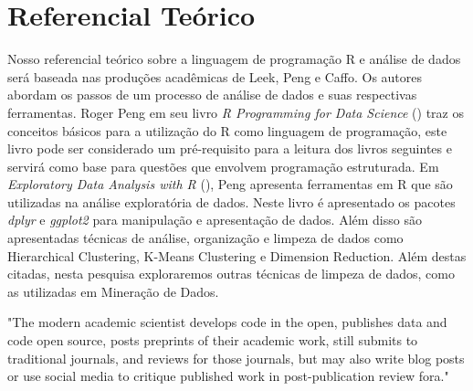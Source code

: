\chapter[Referencial Teórico]{Referencial Teórico}

Nosso referencial teórico sobre a linguagem de programação R e análise de dados 
será baseada nas produções acadêmicas de Leek, Peng e Caffo. Os autores abordam os passos de um processo de análise de dados e 
suas respectivas ferramentas. Roger Peng em seu livro \emph{R Programming for Data 
Science} (\citeyear{Peng2015a}) traz os conceitos básicos para a utilização do R como linguagem de 
programação, este livro pode ser considerado um pré-requisito para a leitura dos 
livros seguintes e servirá como base para questões que envolvem programação 
estruturada. Em \emph{Exploratory Data Analysis with R} (\citeyear{Peng2016}), Peng apresenta ferramentas 
em R que são utilizadas na análise exploratória de dados. Neste livro é 
apresentado os pacotes \emph{dplyr} \cite{Wickham2018} e \emph{ggplot2} \cite{Wickham2009} para manipulação e apresentação de 
dados. Além disso são apresentadas técnicas de análise, organização e limpeza de 
dados como Hierarchical Clustering, K-Means Clustering e Dimension Reduction. 
Além destas citadas, nesta pesquisa exploraremos outras técnicas de limpeza de 
dados, como as utilizadas em Mineração de Dados.

\begin{citacao}[english]
  "The modern academic scientist develops code in the open, publishes data and 
code open source, posts preprints of their academic work, still submits to 
traditional journals, and reviews for those journals, but may also write blog 
posts or use social media to critique published work in post-publication review 
fora."\cite{Peng2015}
\end{citacao}
